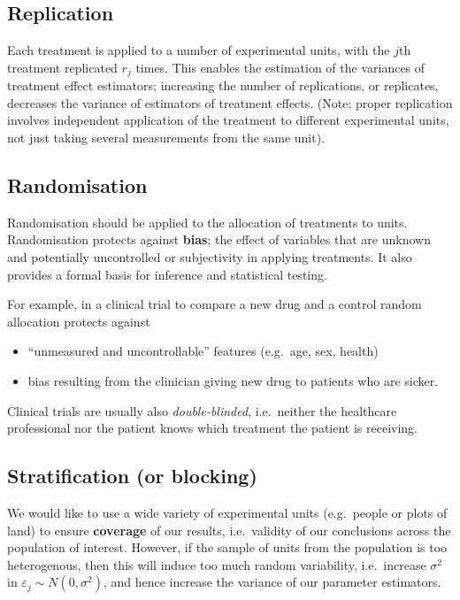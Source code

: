 \documentclass[
]{book}
\providecommand{\tightlist}{%
  \setlength{\itemsep}{0pt}\setlength{\parskip}{0pt}}
\theoremstyle{definition}
\theoremstyle{definition}
\theoremstyle{definition}
\theoremstyle{definition}
\theoremstyle{remark}
\begin{document}
\hypertarget{replication}{%
\subsection{Replication}\label{replication}}

Each treatment is applied to a number of experimental units, with the \(j\)th treatment replicated \(r_{j}\) times. This enables the estimation of the variances of treatment effect estimators; increasing the number of replications, or replicates, decreases the variance of estimators of treatment effects.
(Note: proper replication involves independent application of the treatment to different experimental units, not just taking several measurements from the same unit).

\hypertarget{randomisation}{%
\subsection{Randomisation}\label{randomisation}}

Randomisation should be applied to the allocation of treatments to units. Randomisation protects against \textbf{bias}; the effect of
variables that are unknown and potentially uncontrolled or
subjectivity in applying treatments. It also provides a formal basis
for inference and statistical testing.

For example, in a clinical trial to compare a new drug and a control random allocation protects against

\begin{itemize}
\tightlist
\item
  ``unmeasured and uncontrollable'' features (e.g.~age, sex, health)
\item
  bias resulting from the clinician giving new drug to patients who are sicker.
\end{itemize}

Clinical trials are usually also \emph{double-blinded}, i.e.~neither the healthcare professional nor the patient knows which treatment the patient is receiving.

\hypertarget{intro-blocking}{%
\subsection{Stratification (or blocking)}\label{intro-blocking}}

We would like to use a wide variety of experimental units (e.g.~people or plots of land) to ensure \textbf{coverage} of our results, i.e.~validity of our conclusions across the population of interest. However, if the sample of units from the population is too heterogenous, then this will induce too much random variability, i.e.~increase \(\sigma^{2}\) in \(\varepsilon_{j}\sim N(0,\sigma^{2})\), and hence increase the variance of our parameter estimators.
\end{document}
